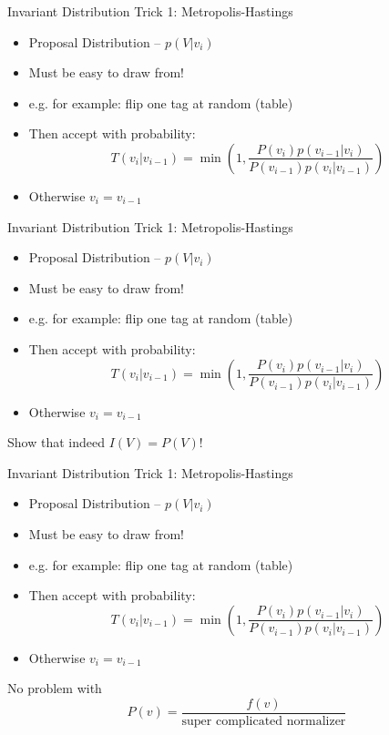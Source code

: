 \documentclass[11pt]{beamer}
\begin{document}
	\begin{frame}{Invariant Distribution Trick 1: Metropolis-Hastings}
		\begin{itemize}
			\item Proposal Distribution -- $p(V|v_i)$
			\item Must be easy to draw from!
			\item e.g. for example: flip one tag at random (table)
			\item Then accept with probability:
				$$T(v_i|v_{i-1}) = \min\left(1,\frac{P(v_i)p(v_{i-1}|v_i)}{P(v_{i-1})p(v_i|v_{i-1})}\right)$$
			\item Otherwise $v_i = v_{i-1}$
		\end{itemize}
	\end{frame}
	
	\begin{frame}{Invariant Distribution Trick 1: Metropolis-Hastings}
		\begin{itemize}
			\item Proposal Distribution -- $p(V|v_i)$
			\item Must be easy to draw from!
			\item e.g. for example: flip one tag at random (table)
			\item Then accept with probability:
				$$T(v_i|v_{i-1}) = \min\left(1,\frac{P(v_i)p(v_{i-1}|v_i)}{P(v_{i-1})p(v_i|v_{i-1})}\right)$$
			\item Otherwise $v_i = v_{i-1}$
		\end{itemize}
		
		\vspace{10pt} Show that indeed $I(V) = P(V)$!
	\end{frame}
	
	\begin{frame}{Invariant Distribution Trick 1: Metropolis-Hastings}
		\begin{itemize}
			\item Proposal Distribution -- $p(V|v_i)$
			\item Must be easy to draw from!
			\item e.g. for example: flip one tag at random (table)
			\item Then accept with probability:
				$$T(v_i|v_{i-1}) = \min\left(1,\frac{P(v_i)p(v_{i-1}|v_i)}{P(v_{i-1})p(v_i|v_{i-1})}\right)$$
			\item Otherwise $v_i = v_{i-1}$
		\end{itemize}
		
		\vspace{10pt} No problem with $$P(v) = \frac{f(v)}{\mbox{super complicated normalizer}}$$
	\end{frame}
	
\end{document}
